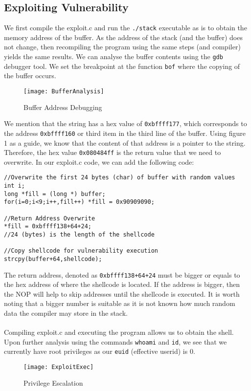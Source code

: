 \documentclass[a4paper,12pt]{article}
\begin{document}
	\subsection{Exploiting Vulnerability}
	We first compile the exploit.c and run the \texttt{./stack} executable as is to obtain the memory address of the buffer. As the address of the stack (and the buffer) does not change, then recompiling the program using the same steps (and compiler) yields the same results. We can analyse the buffer contents using the \texttt{gdb} debugger tool. We set the breakpoint at the function \texttt{bof} where the copying of the buffer occurs.
	\begin{figure}[H]
		\centering
		\texttt{[image: BufferAnalysis]}
		\caption{Buffer Address Debugging}
		\label{fig:bufferanalysis}
	\end{figure}
	\noindent We mention that the string has a hex value of \texttt{0xbffff177}, which corresponds to the address \texttt{0xbffff160} or third item in the third line of the buffer. Using figure 1 as a guide, we know that the content of that address is a pointer to the string. Therefore, the hex value \texttt{0x080484ff} is the return value that we need to overwrite.
	In our exploit.c code, we can add the following code:
	\begin{verbatim}
//Overwrite the first 24 bytes (char) of buffer with random values
int i;
long *fill = (long *) buffer;
for(i=0;i<9;i++,fill++) *fill = 0x90909090;

//Return Address Overwrite
*fill = 0xbffff138+64+24;
//24 (bytes) is the length of the shellcode

//Copy shellcode for vulnerability execution
strcpy(buffer+64,shellcode);
	\end{verbatim}
	The return address, denoted as \texttt{0xbffff138+64+24} must be bigger or equals to the hex address of where the shellcode is located. If the address is bigger, then the NOP will help to skip addresses until the shellcode is executed. It is worth noting that a bigger number is suitable as it is not known how much random data the compiler may store in the stack.\\\\Compiling exploit.c and executing the program allows us to obtain the shell. Upon further analysis using the commands \texttt{whoami} and \texttt{id}, we see that we currently have root privileges as our \texttt{euid} (effective userid) is 0.
	\begin{figure}[H]
		\centering
		\texttt{[image: ExploitExec]}
		\caption{Privilege Escalation}
		\label{fig:exploitexec}
	\end{figure}
\end{document}
